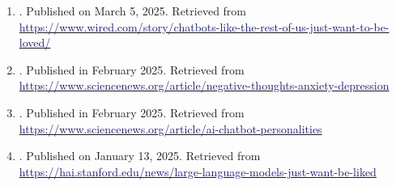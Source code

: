

\begin{enumerate}
  \item {}. Published on March 5, 2025. Retrieved from \href{https://www.wired.com/story/chatbots-like-the-rest-of-us-just-want-to-be-loved/}{\textcolor{MidnightBlue}{https://www.wired.com/story/chatbots-like-the-rest-of-us-just-want-to-be-loved/}}
  
  \item {}. Published in February 2025. Retrieved from \href{https://www.sciencenews.org/article/negative-thoughts-anxiety-depression}{\textcolor{MidnightBlue}{https://www.sciencenews.org/article/negative-thoughts-anxiety-depression}}
  
  \item {}. Published in February 2025. Retrieved from \href{https://www.sciencenews.org/article/ai-chatbot-personalities}{\textcolor{MidnightBlue}{https://www.sciencenews.org/article/ai-chatbot-personalities}}
  
  \item {}. Published on January 13, 2025. Retrieved from \href{https://hai.stanford.edu/news/large-language-models-just-want-be-liked}{\textcolor{MidnightBlue}{https://hai.stanford.edu/news/large-language-models-just-want-be-liked}}

\end{enumerate}
